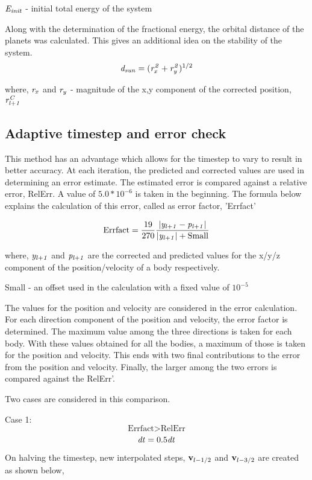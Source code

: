 \documentclass{article}
\begin{document}
{{$\it E_{init}$ - initial total energy of the system
\smallskip

Along with the determination of the fractional energy, the orbital distance of the planets was calculated. This gives an additional idea on the stability of the system. 
\[ {\it d_{sun}} = ({\it r_x^2} + {\it r_y^2})^{1/2} \]

where,
${\it r_x}$ and ${\it r_y}$ -  magnitude of the x,y component of the corrected position, ${\it r_{l+1}^C}$
}
\subsection{Adaptive timestep and error check}
{\normalsize{

This method has an advantage which allows for the timestep to vary to result in better accuracy. At each iteration, the predicted and corrected values are used in determining an error estimate. The estimated error is compared against a relative error, RelErr. A value of $5.0 * 10^{-6}$ is taken in the beginning. The formula below explains the calculation of this error, called as error factor, 'Errfact'

\[ \textrm{Errfact} = \frac{19}{270} \frac{\left| {\it y_{l+1}} - {\it p_{l+1}} \right|} {{\left| {\it y_{l+1}} \right|} + \textrm{Small}} \]
\smallskip

where,
${\it y_{l+1}}$ and ${\it p_{l+1}}$ are the corrected and predicted values for the x/y/z component of the position/velocity of a body respectively. 

Small - an offset used in the calculation with a fixed value of $10^{-5}$ 

The values for the position and velocity are considered in the error calculation. For each direction component of the position and velocity, the error factor is determined. The maximum value among the three directions is taken for each body. With these values obtained for all the bodies, a maximum of those is taken for the position and velocity. This ends with two final contributions to the error from the position and velocity.  Finally, the larger among the two errors is compared against the RelErr'. 

Two cases are considered in this comparison.
\smallskip

Case 1:  \[\textrm{Errfact} > \textrm{RelErr} \]   \[{\it dt} = 0.5{\it dt} \]

On halving the timestep, new interpolated steps, ${\bf v}_{l-{1/2}}$ and ${\bf v}_{l-{3/2}}$ are created as shown below,

}}}
\end{document}
